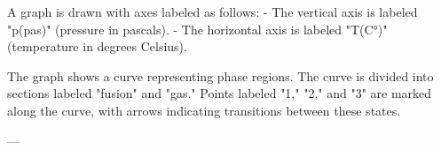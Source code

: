 A graph is drawn with axes labeled as follows:  
- The vertical axis is labeled "p(pas)" (pressure in pascals).  
- The horizontal axis is labeled "T(C°)" (temperature in degrees Celsius).  

The graph shows a curve representing phase regions. The curve is divided into sections labeled "fusion" and "gas." Points labeled "1," "2," and "3" are marked along the curve, with arrows indicating transitions between these states.  

---